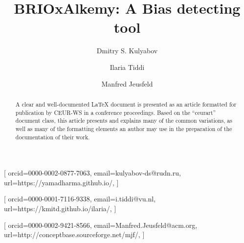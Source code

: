 \documentclass[
]{ceurart}
\begin{document}


\title{BRIOxAlkemy: A Bias detecting tool}

\tnotemark[1]

\author[1,2]{Dmitry S. Kulyabov}[%
orcid=0000-0002-0877-7063,
email=kulyabov-ds@rudn.ru,
url=https://yamadharma.github.io/,
]
\cormark[1]
\fnmark[1]
\address[1]{Peoples' Friendship University of Russia (RUDN University),
  6 Miklukho-Maklaya St, Moscow, 117198, Russian Federation}
\address[2]{Joint Institute for Nuclear Research,
  6 Joliot-Curie, Dubna, Moscow region, 141980, Russian Federation}

\author[3]{Ilaria Tiddi}[%
orcid=0000-0001-7116-9338,
email=i.tiddi@vu.nl,
url=https://kmitd.github.io/ilaria/,
]
\fnmark[1]
\address[3]{Vrije Universiteit Amsterdam, De Boelelaan 1105, 1081 HV Amsterdam, The Netherlands}

\author[4]{Manfred Jeusfeld}[%
orcid=0000-0002-9421-8566,
email=Manfred.Jeusfeld@acm.org,
url=http://conceptbase.sourceforge.net/mjf/,
]
\fnmark[1]
\address[4]{University of Skövde, Högskolevägen 1, 541 28 Skövde, Sweden}


\begin{abstract}
  A clear and well-documented \LaTeX{} document is presented as an
  article formatted for publication by CEUR-WS in a conference
  proceedings. Based on the ``ceurart'' document class, this article
  presents and explains many of the common variations, as well as many
  of the formatting elements an author may use in the preparation of
  the documentation of their work.
\end{abstract}
\end{document}
